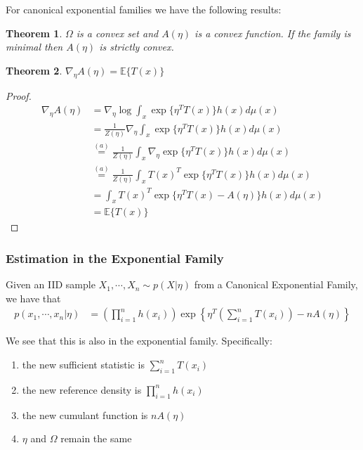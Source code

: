 \documentclass[]{article}
\theoremstyle{mattstyle}
\newtheorem{theorem}{Theorem}[section]
\theoremstyle{definition}
\begin{document}
For canonical exponential families we have the following results:

\begin{theorem}
	$\Omega$ is a convex set and $A(\eta)$ is a convex function. If the family is minimal then $A(\eta)$ is strictly convex.
\end{theorem}

\begin{theorem}
	$\nabla_{\eta}A(\eta) = \mathbb{E}\{T(x)\}$
\end{theorem}
\begin{proof}
	\begin{align*}
	\nabla_{\eta}A(\eta) &= \nabla_{\eta} \log \int_x \exp\{ \eta^TT(x)\}h(x)d\mu(x)\\
	 &= \frac{1}{Z(\eta)}\nabla_{\eta} \int_x \exp\{ \eta^TT(x)\}h(x)d\mu(x)\\
	 &\overset{(a)}{=} \frac{1}{Z(\eta)}\int_x \nabla_{\eta} \exp\{ \eta^TT(x)\}h(x)d\mu(x)\\
	 &\overset{(a)}{=} \frac{1}{Z(\eta)}\int_x T(x)^T\exp\{ \eta^TT(x)\}h(x)d\mu(x)\\
	 &=\int_x T(x)^T\exp\{ \eta^TT(x)-A(\eta)\}h(x)d\mu(x)\\
	 &=\mathbb{E}\{T(x)\}
	\end{align*}
\end{proof}

\subsubsection{Estimation in the Exponential Family}

Given an IID sample $X_1, \cdots, X_n \sim p(X|\eta)$ from a Canonical Exponential Family, we have that
\begin{align*}
p(x_1, \cdots, x_n|\eta) &= \left(\prod_{i=1}^n h(x_i)\right) \exp\left\{ \eta^T\left(\sum_{i=1}^nT(x_i)\right) - nA(\eta)\right\}
\end{align*}

We see that this is also in the exponential family. Specifically:
\begin{enumerate}
	\item the new sufficient statistic is $\sum_{i=1}^nT(x_i)$
	\item the new reference density is $\prod_{i=1}^n h(x_i)$
	\item the new cumulant function is $nA(\eta)$
	\item $\eta$ and $\Omega$ remain the same
\end{enumerate}
\end{document}
